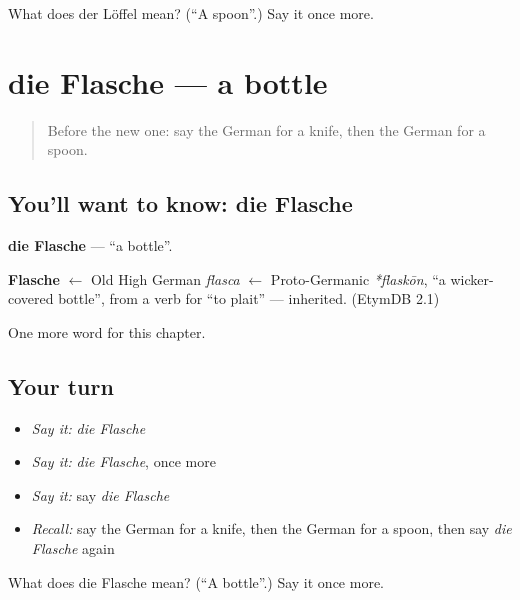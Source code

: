 \begin{tcolorbox}[breakable,colback=teal!4,colframe=teal!35!black,title={Before you move on}]
What does der Löffel mean? (\textquotedblleft{}A spoon\textquotedblright{}.) Say it once more.
\end{tcolorbox}
\section[die Flasche]{die Flasche — a bottle}

\label{lesson:GE-C80-flasche}



\begin{quote}
Before the new one: say the German for a knife, then the German for a spoon.
\end{quote}

\subsection*{You'll want to know: die Flasche}
\textbf{die Flasche} — \textquotedblleft{}a bottle\textquotedblright{}.

\begin{cousinweb}
\textbf{Flasche} $\leftarrow$ Old High German \emph{flasca} $\leftarrow$ Proto-Germanic \emph{*flaskōn}, \textquotedblleft{}a wicker-covered bottle\textquotedblright{}, from a verb for \textquotedblleft{}to plait\textquotedblright{} — inherited. (EtymDB 2.1)
\end{cousinweb}

\begin{grammarlens}[title={What you've built}]
One more word for this chapter.
\end{grammarlens}

\subsection*{Your turn}
\begin{itemize}
\raggedright
  \item \emph{Say it:} \emph{die Flasche}
  \item \emph{Say it:} \emph{die Flasche}, once more
  \item \emph{Say it:} say \emph{die Flasche}
  \item \emph{Recall:} say the German for a knife, then the German for a spoon, then say \emph{die Flasche} again
\end{itemize}

\begin{tcolorbox}[breakable,colback=teal!4,colframe=teal!35!black,title={Before you move on}]
What does die Flasche mean? (\textquotedblleft{}A bottle\textquotedblright{}.) Say it once more.
\end{tcolorbox}
